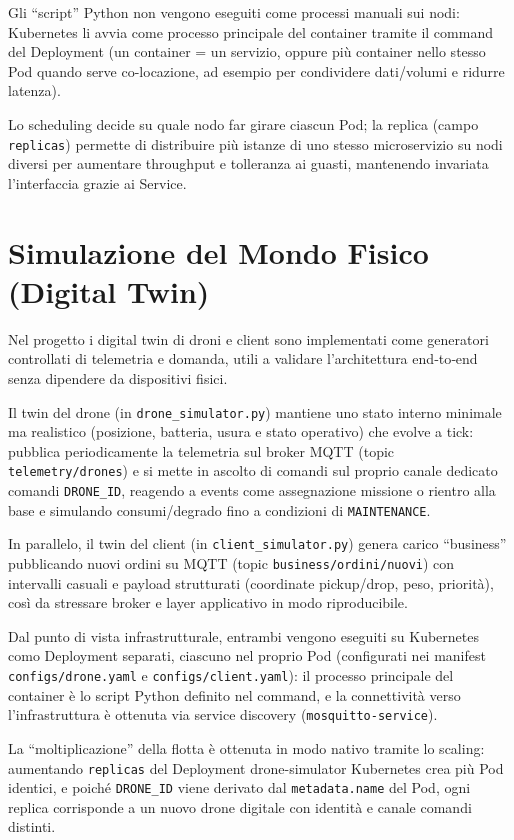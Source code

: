 Gli “script” Python non vengono eseguiti come processi manuali sui nodi: Kubernetes li avvia come processo principale del container tramite il command del Deployment (un container = un servizio, oppure più container nello stesso Pod quando serve co-locazione, ad esempio per condividere dati/volumi e ridurre latenza).

Lo scheduling decide su quale nodo far girare ciascun Pod; la replica (campo \texttt{replicas}) permette di distribuire più istanze di uno stesso microservizio su nodi diversi per aumentare throughput e tolleranza ai guasti, mantenendo invariata l’interfaccia grazie ai Service.

\section{Simulazione del Mondo Fisico (Digital Twin)}
\label{sec:digital_twin}

Nel progetto i digital twin di droni e client sono implementati come generatori controllati di telemetria e domanda, utili a validare l’architettura end‑to‑end senza dipendere da dispositivi fisici.

Il twin del drone (in \texttt{drone\_simulator.py}) mantiene uno stato interno minimale ma realistico (posizione, batteria, usura e stato operativo) che evolve a tick: pubblica periodicamente la telemetria sul broker MQTT (topic \texttt{telemetry/drones}) e si mette in ascolto di comandi sul proprio canale dedicato comandi \texttt{DRONE\_ID}, reagendo a events come assegnazione missione o rientro alla base e simulando consumi/degrado fino a condizioni di \texttt{MAINTENANCE}.

In parallelo, il twin del client (in \texttt{client\_simulator.py}) genera carico “business” pubblicando nuovi ordini su MQTT (topic \texttt{business/ordini/nuovi}) con intervalli casuali e payload strutturati (coordinate pickup/drop, peso, priorità), così da stressare broker e layer applicativo in modo riproducibile.

Dal punto di vista infrastrutturale, entrambi vengono eseguiti su Kubernetes como Deployment separati, ciascuno nel proprio Pod (configurati nei manifest \texttt{configs/drone.yaml} e \texttt{configs/client.yaml}): il processo principale del container è lo script Python definito nel command, e la connettività verso l’infrastruttura è ottenuta via service discovery (\texttt{mosquitto-service}).

La “moltiplicazione” della flotta è ottenuta in modo nativo tramite lo scaling: aumentando \texttt{replicas} del Deployment drone-simulator Kubernetes crea più Pod identici, e poiché \texttt{DRONE\_ID} viene derivato dal \texttt{metadata.name} del Pod, ogni replica corrisponde a un nuovo drone digitale con identità e canale comandi distinti.

